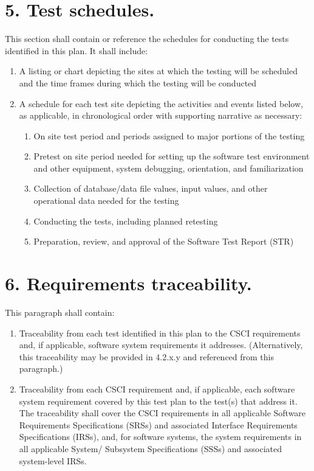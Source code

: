 \section{5. Test schedules.}

This section shall contain or reference the schedules for conducting the
tests identified in this plan. It shall include:

\begin{enumerate}
\itemsep1pt\parskip0pt
\item
  A listing or chart depicting the sites at which the testing will be
  scheduled and the time frames during which the testing will be
  conducted
\item
  A schedule for each test site depicting the activities and events
  listed below, as applicable, in chronological order with supporting
  narrative as necessary:

  \begin{enumerate}
  \itemsep1pt\parskip0pt
  \item
    On site test period and periods assigned to major portions of the
    testing
  \item
    Pretest on site period needed for setting up the software test
    environment and other equipment, system debugging, orientation, and
    familiarization
  \item
    Collection of database/data file values, input values, and other
    operational data needed for the testing
  \item
    Conducting the tests, including planned retesting
  \item
    Preparation, review, and approval of the Software Test Report (STR)
  \end{enumerate}
\end{enumerate}

\section{6. Requirements traceability.}

This paragraph shall contain:

\begin{enumerate}
\itemsep1pt\parskip0pt
\item
  Traceability from each test identified in this plan to the CSCI
  requirements and, if applicable, software system requirements it
  addresses. (Alternatively, this traceability may be provided in
  4.2.x.y and referenced from this paragraph.)
\item
  Traceability from each CSCI requirement and, if applicable, each
  software system requirement covered by this test plan to the test(s)
  that address it. The traceability shall cover the CSCI requirements in
  all applicable Software Requirements Specifications (SRSs) and
  associated Interface Requirements Specifications (IRSs), and, for
  software systems, the system requirements in all applicable System/
  Subsystem Specifications (SSSs) and associated system-level IRSs.
\end{enumerate}

